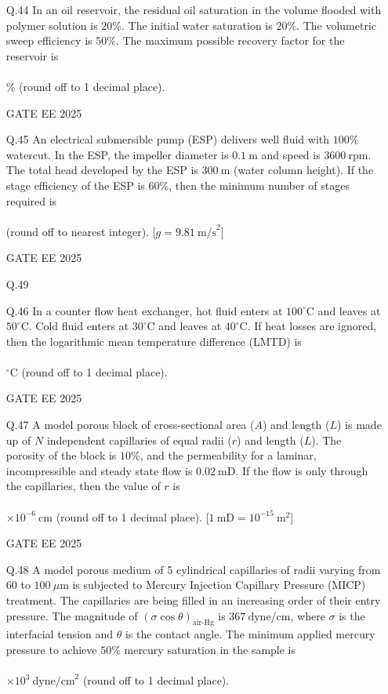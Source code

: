 \documentclass[journal]{IEEEtran}
\begin{document}
\begin{enumerate}[leftmargin=*,series=q]
\vspace{0.5cm}
\item[Q.44] In an oil reservoir, the residual oil saturation in the volume flooded with polymer solution is $20\%$.  
The initial water saturation is $20\%$.  
The volumetric sweep efficiency is $50\%$.  
The maximum possible recovery factor for the reservoir is \\\\ \% (round off to 1 decimal place).  

GATE EE 2025
\vspace{0.5cm}
\item[Q.45] An electrical submersible pump (ESP) delivers well fluid with $100\%$ watercut.  
In the ESP, the impeller diameter is $0.1 \ \text{m}$ and speed is $3600 \ \text{rpm}$.  
The total head developed by the ESP is $300 \ \text{m}$ (water column height).  
If the stage efficiency of the ESP is $60\%$, then the minimum number of stages required is \\\\ (round off to nearest integer).  
[$g = 9.81 \ \text{m/s}^2$]  

GATE EE 2025
\item[Q.49] 
\item[Q.46] In a counter flow heat exchanger, hot fluid enters at $100^\circ \text{C}$ and leaves at $50^\circ \text{C}$.  
Cold fluid enters at $30^\circ \text{C}$ and leaves at $40^\circ \text{C}$.  
If heat losses are ignored, then the logarithmic mean temperature difference (LMTD) is \\\\ $^\circ \text{C}$ (round off to 1 decimal place).  

GATE EE 2025

\vspace{0.5cm}
\item[Q.47] A model porous block of cross-sectional area ($A$) and length ($L$) is made up of $N$ independent capillaries of equal radii ($r$) and length ($L$).  
The porosity of the block is $10\%$, and the permeability for a laminar, incompressible and steady state flow is $0.02 \ \text{mD}$.  
If the flow is only through the capillaries, then the value of $r$ is \\\\ $\times 10^{-6} \ \text{cm}$ (round off to 1 decimal place).  
[$1 \ \text{mD} = 10^{-15} \ \text{m}^2$]  

GATE EE 2025
\vspace{0.5cm}
\item[Q.48] A model porous medium of 5 cylindrical capillaries of radii varying from $60$ to $100 \ \mu\text{m}$ is subjected to Mercury Injection Capillary Pressure (MICP) treatment.  
The capillaries are being filled in an increasing order of their entry pressure.  
The magnitude of $(\sigma \cos \theta)_{\text{air-Hg}}$ is $367 \ \text{dyne/cm}$, where $\sigma$ is the interfacial tension and $\theta$ is the contact angle.  
The minimum applied mercury pressure to achieve $50\%$ mercury saturation in the sample is \\\\ $\times 10^3 \ \text{dyne/cm}^2$ (round off to 1 decimal place).  



\end{enumerate}
\end{document}
